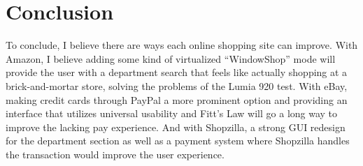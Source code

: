 \documentclass[11pt, oneside]{article}   	%
\begin{document}
\section{Conclusion}
To conclude, I believe there are ways each online shopping site can improve. With Amazon, I believe adding some kind of virtualized ``WindowShop'' mode will provide the user with a department search that feels like actually shopping at a brick-and-mortar store, solving the problems of the Lumia 920 test. With eBay, making credit cards through PayPal a more prominent option and providing an interface that utilizes universal usability and Fitt's Law will go a long way to improve the lacking pay experience. And with Shopzilla, a strong GUI redesign for the department section as well as a payment system where Shopzilla handles the transaction would improve the user experience.
\end{document}
